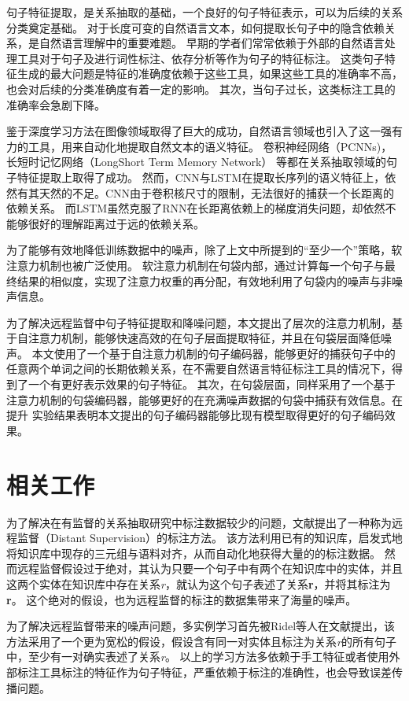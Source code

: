 \documentclass[UTF8]{csoarticle}
\begin{document}
句子特征提取，是关系抽取的基础，一个良好的句子特征表示，可以为后续的关系分类奠定基础。
对于长度可变的自然语言文本，如何提取长句子中的隐含依赖关系，是自然语言理解中的重要难题。
早期的学者们常常依赖于外部的自然语言处理工具对于句子及进行词性标注、依存分析等作为句子的特征标注。
这类句子特征生成的最大问题是特征的准确度依赖于这些工具，如果这些工具的准确率不高，也会对后续的分类准确度有着一定的影响。
其次，当句子过长，这类标注工具的准确率会急剧下降。

鉴于深度学习方法在图像领域取得了巨大的成功，自然语言领域也引入了这一强有力的工具，用来自动化地提取自然文本的语义特征。
卷积神经网络（PCNNs)，长短时记忆网络（LongShort Term Memory Network） 等都在关系抽取领域的句子特征提取上取得了成功。
然而，CNN与LSTM在提取长序列的语义特征上，依然有其天然的不足。CNN由于卷积核尺寸的限制，无法很好的捕获一个长距离的依赖关系。
而LSTM虽然克服了RNN在长距离依赖上的梯度消失问题，却依然不能够很好的理解距离过于远的依赖关系。

为了能够有效地降低训练数据中的噪声，除了上文中所提到的“至少一个”策略，软注意力机制也被广泛使用。
软注意力机制在句袋内部，通过计算每一个句子与最终结果的相似度，实现了注意力权重的再分配，有效地利用了句袋内的噪声与非噪声信息。

为了解决远程监督中句子特征提取和降噪问题，本文提出了层次的注意力机制，基于自注意力机制，能够快速高效的在句子层面提取特征，并且在句袋层面降低噪声。
本文使用了一个基于自注意力机制的句子编码器，能够更好的捕获句子中的任意两个单词之间的长期依赖关系，在不需要自然语言特征标注工具的情况下，得到了一个有更好表示效果的句子特征。
其次，在句袋层面，同样采用了一个基于注意力机制的句袋编码器，能够更好的在充满噪声数据的句袋中捕获有效信息。在提升
实验结果表明本文提出的句子编码器能够比现有模型取得更好的句子编码效果。

\section{相关工作}
为了解决在有监督的关系抽取研究中标注数据较少的问题，文献\cite{bib1}提出了一种称为远程监督（Distant Supervision）的标注方法。
该方法利用已有的知识库，启发式地将知识库中现存的三元组与语料对齐，从而自动化地获得大量的的标注数据。
然而远程监督假设过于绝对，其认为只要一个句子中有两个在知识库中的实体，并且这两个实体在知识库中存在关系\textit{r}，就认为这个句子表述了关系\textbf{r}，并将其标注为\textbf{r}。
这个绝对的假设，也为远程监督的标注的数据集带来了海量的噪声。

为了解决远程监督带来的噪声问题，多实例学习首先被Ridel等人在文献\cite{bib2}提出，该方法采用了一个更为宽松的假设，假设含有同一对实体且标注为关系\textit{r}的所有句子中，至少有一对确实表述了关系\textit{r}。
以上的学习方法多依赖于手工特征或者使用外部标注工具标注的特征作为句子特征，严重依赖于标注的准确性，也会导致误差传播问题。
\end{document}
